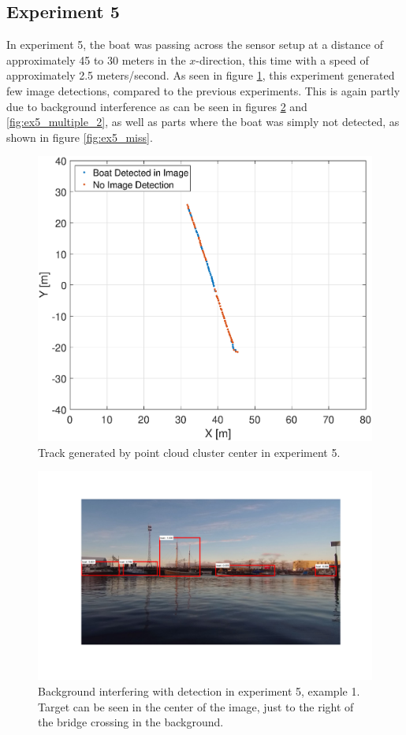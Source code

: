 \subsection{Experiment 5}
In experiment 5, the boat was passing across the sensor setup at a distance of approximately 45 to 30 meters in the $x$-direction, this time with a speed of approximately 2.5 meters/second. As seen in figure \ref{fig:ex5_track}, this experiment generated few image detections, compared to the previous experiments. This is again partly due to background interference as can be seen in figures \ref{fig:ex5_multiple_1} and \ref{fig:ex5_multiple_2}, as well as parts where the boat was simply not detected, as shown in figure \ref{fig:ex5_miss}.
\begin{figure}[!htb]
	\centering
	\includegraphics[width=.8\linewidth]{fig/exp_5_track.eps}
	\caption{Track generated by point cloud cluster center in experiment 5.}
	\label{fig:ex5_track}
\end{figure}
\begin{figure}[h]
	\centering
	\includegraphics[width=\linewidth]{fig/ex5_multiple_2.png}
	\caption{Background interfering with detection in experiment 5, example 1. Target can be seen in the center of the image, just to the right of the bridge crossing in the background.}
	\label{fig:ex5_multiple_1}
\end{figure}%
